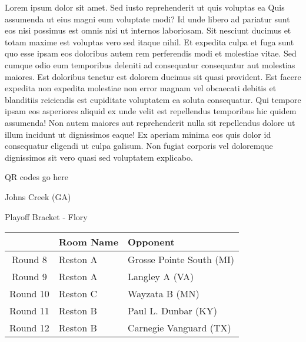 \documentclass{article}%
\begin{document}
\vspace*{8pt}%
\linebreak%
\newline%
\newline%
Lorem ipsum dolor sit amet. Sed iusto reprehenderit ut quis voluptas ea Quis assumenda ut eius magni eum voluptate modi? Id unde libero ad pariatur sunt eos nisi possimus est omnis nisi ut internos laboriosam. Sit nesciunt ducimus et totam maxime est voluptas vero sed itaque nihil. Et expedita culpa et fuga sunt quo esse ipsam eos doloribus autem rem perferendis modi et molestiae vitae.\newline%
\newline%
Sed cumque odio eum temporibus deleniti ad consequatur consequatur aut molestias maiores. Est doloribus tenetur est dolorem ducimus sit quasi provident. Est facere expedita non expedita molestiae non error magnam vel obcaecati debitis et blanditiis reiciendis est cupiditate voluptatem ea soluta consequatur. Qui tempore ipsam eos asperiores aliquid ex unde velit est repellendus temporibus hic quidem assumenda!\newline%
\newline%
Non autem maiores aut reprehenderit nulla sit repellendus dolore ut illum incidunt ut dignissimos eaque! Ex aperiam minima eos quis dolor id consequatur eligendi ut culpa galisum. Non fugiat corporis vel doloremque dignissimos sit vero quasi sed voluptatem explicabo.\newline%
\newline%
%
\vspace*{30pt}%
\begin{center}%
\begin{Huge}%
QR codes go here%
\end{Huge}%
\end{center}%
\newpage%
\begin{center}%
\begin{Huge}%
Johns Creek (GA)%
\end{Huge}%
\vspace*{8pt}%
\linebreak%
\begin{Large}%
Playoff Bracket {-} Flory%
\end{Large}%
\end{center}%
%
\begin{tabularx}{\textwidth}{|c|Y|Y|}%
\hline%
&Room Name&Opponent\\%
\hline%
Round 8&Reston A&Grosse Pointe South (MI)\\%
Round 9&Reston A&Langley A (VA)\\%
Round 10&Reston C&Wayzata B (MN)\\%
Round 11&Reston B&Paul L. Dunbar (KY)\\%
Round 12&Reston B&Carnegie Vanguard (TX)\\%
\hline%
\end{tabularx}%
\end{document}
